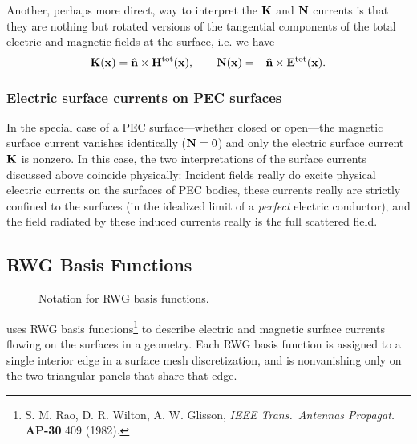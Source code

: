 Another, perhaps more direct, way to interpret the 
$\mathbf{K}$ and $\mathbf{N}$ currents is that they are nothing 
but rotated versions of the tangential components of 
the total electric and magnetic fields at the 
surface, i.e. we have 
$$ \mathbf{K}(\mathbf{x}) = \mathbf{\hat n}\times \mathbf{H}^{\hbox{\scriptsize{tot}}}(\mathbf{x}), 
   \qquad 
   \mathbf{N}(\mathbf{x}) =-\mathbf{\hat n}\times \mathbf{E}^{\hbox{\scriptsize{tot}}}(\mathbf{x}).
$$

\subsubsection*{Electric surface currents on PEC surfaces}

In the special case of a PEC surface---whether closed or
open---the magnetic surface current vanishes identically
($\mathbf{N}=0$) and only the electric surface current 
$\mathbf{K}$ is nonzero. In this case, the two interpretations of the 
surface currents discussed above coincide physically: 
Incident fields really do excite physical electric
currents on the surfaces of PEC bodies, these currents
really are strictly confined to the surfaces (in the
idealized limit of a \textit{perfect} electric conductor),
and the field radiated by these induced currents
really is the full scattered field.

\subsection*{RWG Basis Functions}
\begin{figure}
\begin{center}
\caption{Notation for RWG basis functions.}
\label{RWGNotationFigure}
\end{center}
\end{figure}

\lss uses RWG basis functions\footnote{S. M. Rao, D. R. Wilton, 
A. W. Glisson, \textit{IEEE Trans.\ Antennas Propagat.} 
\textbf{AP-30} 409 (1982).} to describe electric and magnetic 
surface currents flowing on the surfaces in a geometry. 
Each RWG basis function is assigned to a single interior
edge in a surface mesh discretization, and is nonvanishing
only on the two triangular panels that share that 
edge. 

